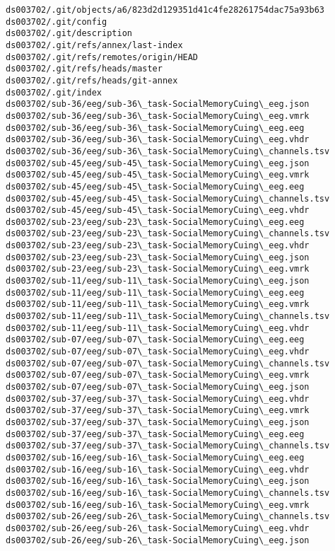 \documentclass[11pt]{article}
\begin{document}
\begin{Verbatim}[commandchars=\\\{\}]
ds003702/.git/objects/a6/823d2d129351d41c4fe28261754dac75a93b63
ds003702/.git/config
ds003702/.git/description
ds003702/.git/refs/annex/last-index
ds003702/.git/refs/remotes/origin/HEAD
ds003702/.git/refs/heads/master
ds003702/.git/refs/heads/git-annex
ds003702/.git/index
ds003702/sub-36/eeg/sub-36\_task-SocialMemoryCuing\_eeg.json
ds003702/sub-36/eeg/sub-36\_task-SocialMemoryCuing\_eeg.vmrk
ds003702/sub-36/eeg/sub-36\_task-SocialMemoryCuing\_eeg.eeg
ds003702/sub-36/eeg/sub-36\_task-SocialMemoryCuing\_eeg.vhdr
ds003702/sub-36/eeg/sub-36\_task-SocialMemoryCuing\_channels.tsv
ds003702/sub-45/eeg/sub-45\_task-SocialMemoryCuing\_eeg.json
ds003702/sub-45/eeg/sub-45\_task-SocialMemoryCuing\_eeg.vmrk
ds003702/sub-45/eeg/sub-45\_task-SocialMemoryCuing\_eeg.eeg
ds003702/sub-45/eeg/sub-45\_task-SocialMemoryCuing\_channels.tsv
ds003702/sub-45/eeg/sub-45\_task-SocialMemoryCuing\_eeg.vhdr
ds003702/sub-23/eeg/sub-23\_task-SocialMemoryCuing\_eeg.eeg
ds003702/sub-23/eeg/sub-23\_task-SocialMemoryCuing\_channels.tsv
ds003702/sub-23/eeg/sub-23\_task-SocialMemoryCuing\_eeg.vhdr
ds003702/sub-23/eeg/sub-23\_task-SocialMemoryCuing\_eeg.json
ds003702/sub-23/eeg/sub-23\_task-SocialMemoryCuing\_eeg.vmrk
ds003702/sub-11/eeg/sub-11\_task-SocialMemoryCuing\_eeg.json
ds003702/sub-11/eeg/sub-11\_task-SocialMemoryCuing\_eeg.eeg
ds003702/sub-11/eeg/sub-11\_task-SocialMemoryCuing\_eeg.vmrk
ds003702/sub-11/eeg/sub-11\_task-SocialMemoryCuing\_channels.tsv
ds003702/sub-11/eeg/sub-11\_task-SocialMemoryCuing\_eeg.vhdr
ds003702/sub-07/eeg/sub-07\_task-SocialMemoryCuing\_eeg.eeg
ds003702/sub-07/eeg/sub-07\_task-SocialMemoryCuing\_eeg.vhdr
ds003702/sub-07/eeg/sub-07\_task-SocialMemoryCuing\_channels.tsv
ds003702/sub-07/eeg/sub-07\_task-SocialMemoryCuing\_eeg.vmrk
ds003702/sub-07/eeg/sub-07\_task-SocialMemoryCuing\_eeg.json
ds003702/sub-37/eeg/sub-37\_task-SocialMemoryCuing\_eeg.vhdr
ds003702/sub-37/eeg/sub-37\_task-SocialMemoryCuing\_eeg.vmrk
ds003702/sub-37/eeg/sub-37\_task-SocialMemoryCuing\_eeg.json
ds003702/sub-37/eeg/sub-37\_task-SocialMemoryCuing\_eeg.eeg
ds003702/sub-37/eeg/sub-37\_task-SocialMemoryCuing\_channels.tsv
ds003702/sub-16/eeg/sub-16\_task-SocialMemoryCuing\_eeg.eeg
ds003702/sub-16/eeg/sub-16\_task-SocialMemoryCuing\_eeg.vhdr
ds003702/sub-16/eeg/sub-16\_task-SocialMemoryCuing\_eeg.json
ds003702/sub-16/eeg/sub-16\_task-SocialMemoryCuing\_channels.tsv
ds003702/sub-16/eeg/sub-16\_task-SocialMemoryCuing\_eeg.vmrk
ds003702/sub-26/eeg/sub-26\_task-SocialMemoryCuing\_channels.tsv
ds003702/sub-26/eeg/sub-26\_task-SocialMemoryCuing\_eeg.vhdr
ds003702/sub-26/eeg/sub-26\_task-SocialMemoryCuing\_eeg.json

\end{Verbatim}
\end{document}
